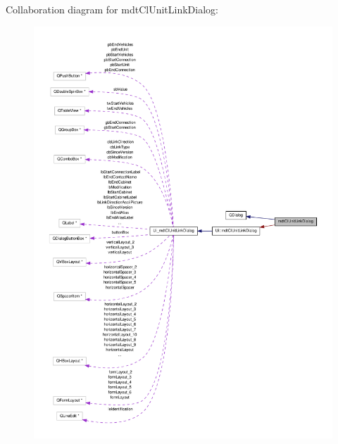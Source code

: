 Collaboration diagram for mdt\-Cl\-Unit\-Link\-Dialog\-:\nopagebreak
\begin{figure}[H]
\begin{center}
\leavevmode
\includegraphics[width=350pt]{classmdt_cl_unit_link_dialog__coll__graph}
\end{center}
\end{figure}
